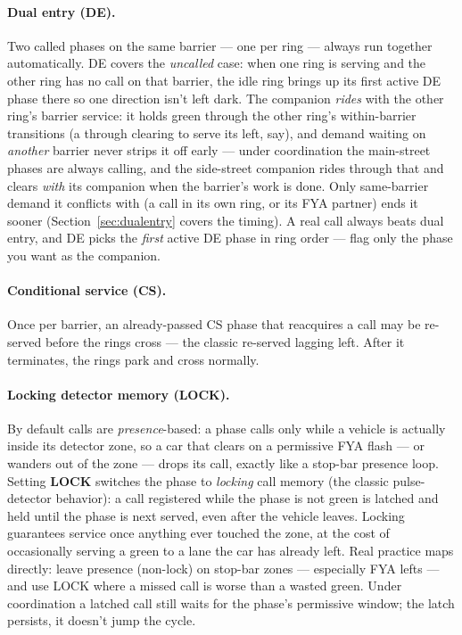 \documentclass[11pt]{article}
\newcommand{\field}[1]{\textsf{\textbf{#1}}}
\begin{document}
\paragraph{Dual entry (DE).} Two called phases on the same barrier — one per ring —
always run together automatically. DE covers the \emph{uncalled} case: when one
ring is serving and the other ring has no call on that barrier, the idle ring
brings up its first active DE phase there so one direction isn't left dark. The
companion \emph{rides} with the other ring's barrier service: it holds green
through the other ring's within-barrier transitions (a through clearing to serve
its left, say), and demand waiting on \emph{another} barrier never strips it off
early — under coordination the main-street phases are always calling, and the
side-street companion rides through that and clears \emph{with} its companion
when the barrier's work is done. Only same-barrier demand it conflicts with (a
call in its own ring, or its FYA partner) ends it sooner
(Section~\ref{sec:dualentry} covers the timing). A real call always beats dual
entry, and DE picks the \emph{first} active DE phase in ring order — flag only
the phase you want as the companion.

\paragraph{Conditional service (CS).} Once per barrier, an already-passed CS phase
that reacquires a call may be re-served before the rings cross — the classic
re-served lagging left. After it terminates, the rings park and cross normally.

\paragraph{Locking detector memory (LOCK).} By default calls are
\emph{presence}-based: a phase calls only while a vehicle is actually inside its
detector zone, so a car that clears on a permissive FYA flash — or wanders out of
the zone — drops its call, exactly like a stop-bar presence loop. Setting
\field{LOCK} switches the phase to \emph{locking} call memory (the classic
pulse-detector behavior): a call registered while the phase is not green is
latched and held until the phase is next served, even after the vehicle leaves.
Locking guarantees service once anything ever touched the zone, at the cost of
occasionally serving a green to a lane the car has already left. Real practice
maps directly: leave presence (non-lock) on stop-bar zones — especially FYA
lefts — and use LOCK where a missed call is worse than a wasted green. Under
coordination a latched call still waits for the phase's permissive window; the
latch persists, it doesn't jump the cycle.
\end{document}
